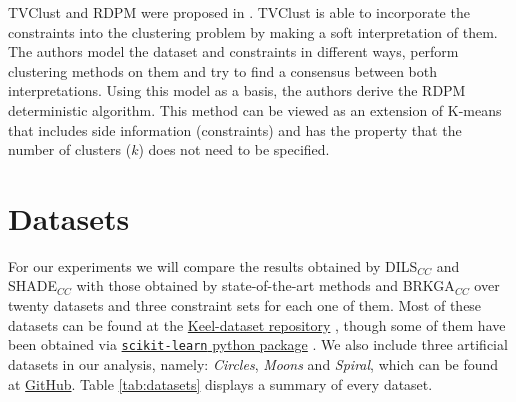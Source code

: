 \acf{TVClust} and \acf{RDPM} were proposed in \cite{khashabi2015clustering}. \acs{TVClust} is able to incorporate the constraints into the clustering problem by making a soft interpretation of them. The authors model the dataset and constraints in different ways, perform clustering methods on them and try to find a consensus between both interpretations. Using this model as a basis, the authors derive the \acs{RDPM} deterministic algorithm. This method can be viewed as an extension of K-means that includes side information (constraints) and has the property that the number of clusters ($k$) does not need to be specified.

\section{Datasets} \label{sec:Datasets}

For our experiments we will compare the results obtained by \acs{DILS}$_{CC}$ and \acs{SHADE}$_{CC}$ with those obtained by state-of-the-art methods and \acs{BRKGA}$_{CC}$ over twenty datasets and three constraint sets for each one of them. Most of these datasets can be found at the \href{https://sci2s.ugr.es/keel/category.php?cat=clas}{Keel-dataset repository} \cite{triguero2017keel}, though some of them have been obtained via
\href{https://scikit-learn.org/stable/datasets/index.html}{\texttt{scikit-learn} python package} \cite{scikit-learn}. We also include three artificial datasets in our analysis, namely: \textit{Circles}, \textit{Moons} and \textit{Spiral}, which can be found at \href{https://github.com/GermangUgr/DILS_CC}{GitHub}. Table \ref{tab:datasets} displays a summary of every dataset.

